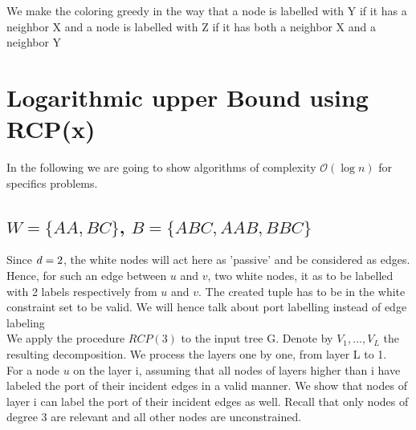 We make the coloring greedy in the way that a node is labelled with Y if it has a neighbor X and a node is labelled with Z if it has both a neighbor X and a neighbor Y



\section{Logarithmic upper Bound using RCP(x)}
In the following we are going to show algorithms of complexity $\mathcal{O}(\log{}n)$ for specifics problems.\\
\subsection{$W = \{AA,BC\}$, $B = \{ABC,AAB,BBC\}$}

Since $d = 2$, the white nodes will act here as 'passive' and be considered as edges. Hence, for such an edge between $u$ and $v$, two white nodes, it as to be labelled with 2 labels respectively from $u$ and $v$. The created tuple has to be in the white constraint set to be valid. We will hence talk about port labelling instead of edge labeling\\

We apply the procedure $RCP(3)$ to the input tree G. Denote by $V_1, . . . , V_L$ the resulting decomposition. We process the layers one by one, from layer L to 1.\\
For a node $u$ on the layer i, assuming that all nodes of layers higher than i have labeled the port of their incident edges in a valid manner. We show that nodes of layer i can label the port of their incident edges as well. Recall that only nodes of degree 3 are relevant and all other nodes are unconstrained.\\

